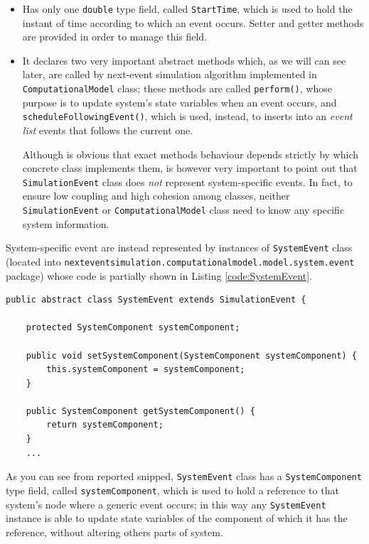 \documentclass[10pt,a4paper]{article}
\begin{document}
\begin{itemize}
\item Has only one \texttt{double} type field, called \texttt{StartTime}, which is used to hold the instant of time according to which an event occurs. Setter and getter methods are provided in order to manage this field.

\item It declares two very important abstract methods which, as we will can see later, are called by next-event simulation algorithm implemented in \texttt{ComputationalModel} class; these methods are called \texttt{perform()}, whose purpose is to update system's state variables when an event occurs, and \texttt{schedule\-Following\-Event()}, which is used, instead, to inserts into an \textit{event list} events that follows the current one.

Although is obvious that exact methods behaviour depends strictly by which concrete class implements them, is however very important to point out that \texttt{SimulationEvent} class does \textit{not} represent system-specific events. In fact, to ensure low coupling and high cohesion among classes, neither \texttt{SimulationEvent} or \texttt{ComputationalModel} class need to know any specific system information. 
\end{itemize}

System-specific event are instead represented by instances of \texttt{SystemEvent} class (located into \texttt{nexteventsimulation.computationalmodel.model.\-sy\-stem.\-ev\-ent} package) whose code is partially shown in Listing \ref{code:SystemEvent}. 


\begin{lstlisting}[frame=lines, caption={\texttt{SystemEvent} class implementation.}, label={code:SystemEvent}]
public abstract class SystemEvent extends SimulationEvent {

    protected SystemComponent systemComponent;

    public void setSystemComponent(SystemComponent systemComponent) {
        this.systemComponent = systemComponent;
    }

    public SystemComponent getSystemComponent() {
        return systemComponent;
    }
    ...
\end{lstlisting}

As you can see from reported snipped, \texttt{SystemEvent} class has a \texttt{SystemCom\-po\-nent} type field, called \texttt{systemComponent}, which is used to hold a reference to that system's node where a generic event occurs; in this way any \texttt{SystemEvent} instance is able to update state variables of the component of which it has the reference, without altering others parts of system.
\end{document}
